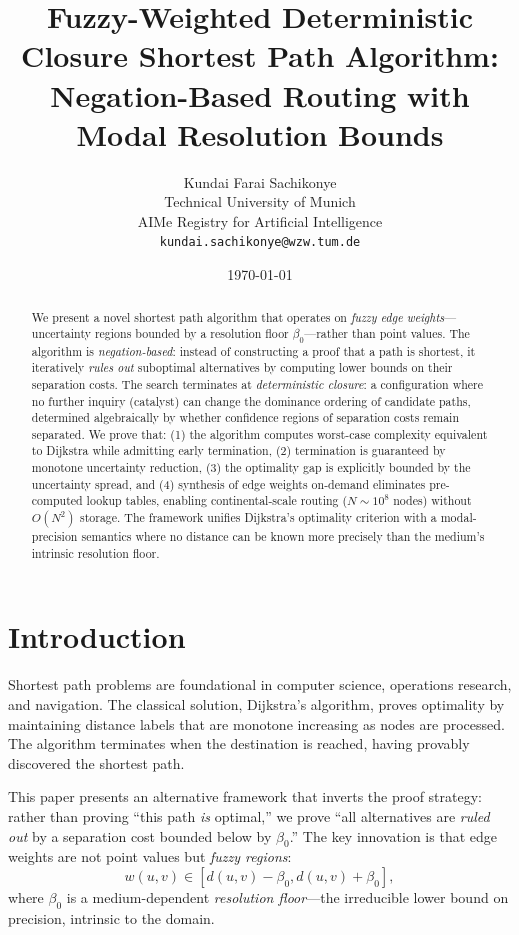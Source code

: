 \documentclass[twocolumn,11pt,a4paper]{article}
\title{Fuzzy-Weighted Deterministic Closure Shortest Path Algorithm:\\
Negation-Based Routing with Modal Resolution Bounds}
\author{%
Kundai Farai Sachikonye\\
\small Technical University of Munich\\
\small AIMe Registry for Artificial Intelligence\\
\small \texttt{kundai.sachikonye@wzw.tum.de}}
\date{\today}
\theoremstyle{definition}
\begin{document}
\maketitle

\begin{abstract}
We present a novel shortest path algorithm that operates on \emph{fuzzy edge weights}---uncertainty regions bounded by a resolution floor $\beta_0$---rather than point values. The algorithm is \emph{negation-based}: instead of constructing a proof that a path is shortest, it iteratively \emph{rules out} suboptimal alternatives by computing lower bounds on their separation costs. The search terminates at \emph{deterministic closure}: a configuration where no further inquiry (catalyst) can change the dominance ordering of candidate paths, determined algebraically by whether confidence regions of separation costs remain separated. We prove that: (1) the algorithm computes worst-case complexity equivalent to Dijkstra while admitting early termination, (2) termination is guaranteed by monotone uncertainty reduction, (3) the optimality gap is explicitly bounded by the uncertainty spread, and (4) synthesis of edge weights on-demand eliminates pre-computed lookup tables, enabling continental-scale routing ($N \sim 10^8$ nodes) without $O(N^2)$ storage. The framework unifies Dijkstra's optimality criterion with a modal-precision semantics where no distance can be known more precisely than the medium's intrinsic resolution floor.
\end{abstract}

\section{Introduction}

Shortest path problems are foundational in computer science, operations research, and navigation. The classical solution, Dijkstra's algorithm, proves optimality by maintaining distance labels that are monotone increasing as nodes are processed. The algorithm terminates when the destination is reached, having provably discovered the shortest path.

This paper presents an alternative framework that inverts the proof strategy: rather than proving ``this path \emph{is} optimal,'' we prove ``all alternatives are \emph{ruled out} by a separation cost bounded below by $\beta_0$.'' The key innovation is that edge weights are not point values but \emph{fuzzy regions}:
\begin{equation}
w(u,v) \in [d(u,v) - \beta_0, d(u,v) + \beta_0],
\end{equation}
where $\beta_0$ is a medium-dependent \emph{resolution floor}---the irreducible lower bound on precision, intrinsic to the domain.
\end{document}
